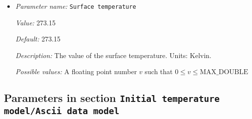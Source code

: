 \begin{itemize}
{\it Value:} 1673.15


{\it Default:} 1673.15


{\it Description:} The value of the isothermal boundary temperature. Units: Kelvin.


{\it Possible values:} A floating point number $v$ such that $0 \leq v \leq \text{MAX\_DOUBLE}$
\item {\it Parameter name:} {\tt Surface temperature}
\label{parameters:Initial temperature model/Adiabatic boundary/Surface temperature}
\label{parameters:Initial_20temperature_20model/Adiabatic_20boundary/Surface_20temperature}


{\it Value:} 273.15


{\it Default:} 273.15


{\it Description:} The value of the surface temperature. Units: Kelvin.


{\it Possible values:} A floating point number $v$ such that $0 \leq v \leq \text{MAX\_DOUBLE}$
\end{itemize}

\subsection{Parameters in section \tt Initial temperature model/Ascii data model}
\label{parameters:Initial_20temperature_20model/Ascii_20data_20model}


